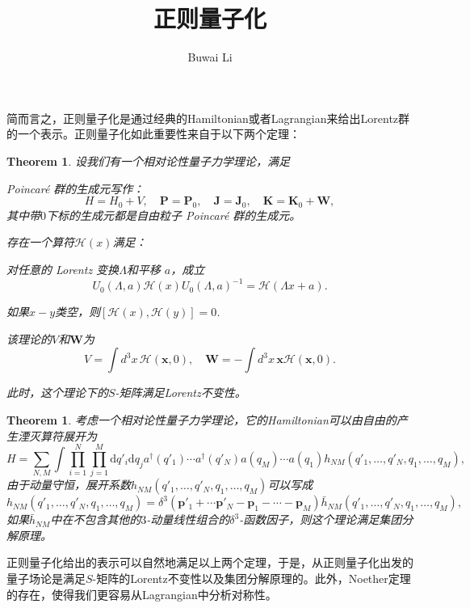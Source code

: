 \documentclass[11pt]{article}
\title{正则量子化}
\author{Buwai Li}
\theoremstyle{definition}
\theoremstyle{plain}
\newtheorem{thm}[para]{Theorem}
\begin{document}
\maketitle

简而言之，正则量子化是通过经典的Hamiltonian或者Lagrangian来给出Lorentz群的一个表示。正则量子化如此重要性来自于以下两个定理：

\begin{thm}
设我们有一个相对论性量子力学理论，满足
\begin{compactenum}
\item Poincar\'{e} 群的生成元写作：\[H=H_0+V,\quad \mathbf{P}= \mathbf{P}_0,\quad \mathbf{J}= \mathbf{J}_0,\quad \mathbf{K}=\mathbf{K}_0+\mathbf{W},\]其中带$0$下标的生成元都是自由粒子 Poincar\'{e} 群的生成元。

\item  存在一个算符$\mathscr{H}(x)$满足：
\begin{compactitem}
	\item 对任意的 Lorentz 变换$\Lambda$和平移 $a$，成立\[U_0(\Lambda,a)\mathscr{H}(x)U_0(\Lambda,a)^{-1}=\mathscr H(\Lambda x+a).\]

	\item 如果$x-y$类空，则$[\mathscr{H}(x),\mathscr{H}(y)]=0$.
\end{compactitem}
\item 该理论的$V$和$\mathbf{W}$为\[V=\int d^3 x\, \mathscr{H}(\mathbf{x},0),\quad\mathbf{W}=-\int d^3 x \, \mathbf{x}\mathscr{H}(\mathbf{x},0).\]
\end{compactenum}
此时，这个理论下的$S$-矩阵满足Lorentz不变性。
\end{thm}

\begin{thm}
考虑一个相对论性量子力学理论，它的Hamiltonian可以由自由的产生湮灭算符展开为
\[
	H=\sum_{N,M}\int \prod_{i=1}^N\prod_{j=1}^M \mathrm{d} q'_i \mathrm{d} q_j a^\dag (q'_1)\cdots a^\dag (q'_N) a(q_M)\cdots a(q_1)h_{NM}(q'_1,\dots,q'_N,q_1,\dots,q_M),
\]
由于动量守恒，展开系数$h_{NM}(q'_1,\dots,q'_N,q_1,\dots,q_M)$可以写成
\[
	h_{NM}(q'_1,\dots,q'_N,q_1,\dots,q_M)=\delta^3(\bm{p}'_1+\cdots \bm{p}'_N-\bm{p}_1-\cdots-\bm{p}_M)\bar{h}_{NM}(q'_1,\dots,q'_N,q_1,\dots,q_M),
\]
如果$\bar{h}_{NM}$中在不包含其他的$3$-动量线性组合的$\delta^3$-函数因子，则这个理论满足集团分解原理。
\end{thm}

正则量子化给出的表示可以自然地满足以上两个定理，于是，从正则量子化出发的量子场论是满足$S$-矩阵的Lorentz不变性以及集团分解原理的。此外，Noether定理的存在，使得我们更容易从Lagrangian中分析对称性。
\end{document}
